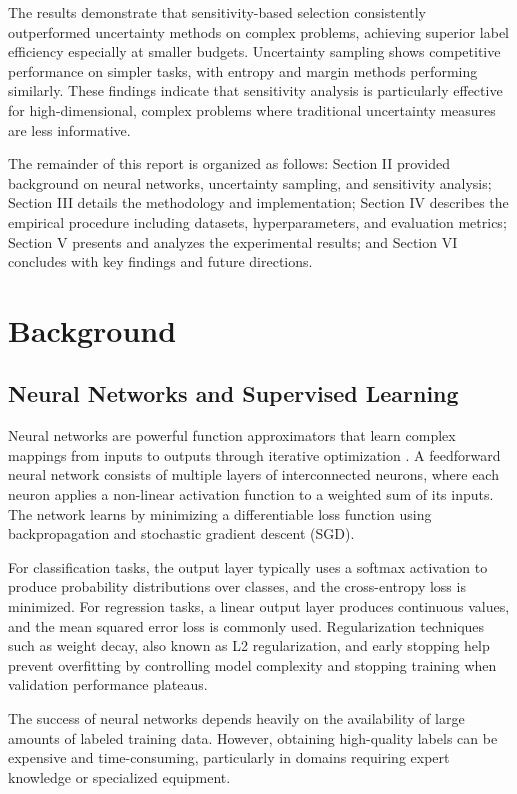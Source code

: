 \documentclass[conference]{IEEEtran}
\begin{document}
The results demonstrate that sensitivity-based selection consistently outperformed uncertainty methods on complex problems, achieving superior label efficiency especially at smaller budgets. Uncertainty sampling shows competitive performance on simpler tasks, with entropy and margin methods performing similarly. These findings indicate that sensitivity analysis is particularly effective for high-dimensional, complex problems where traditional uncertainty measures are less informative.

The remainder of this report is organized as follows: Section II provided background on neural networks, uncertainty sampling, and sensitivity analysis; Section III details the methodology and implementation; Section IV describes the empirical procedure including datasets, hyperparameters, and evaluation metrics; Section V presents and analyzes the experimental results; and Section VI concludes with key findings and future directions.

\section{Background}

\subsection{Neural Networks and Supervised Learning}

Neural networks are powerful function approximators that learn complex mappings from inputs to outputs through iterative optimization \cite{gal2017deep}. A feedforward neural network consists of multiple layers of interconnected neurons, where each neuron applies a non-linear activation function to a weighted sum of its inputs. The network learns by minimizing a differentiable loss function using backpropagation and stochastic gradient descent (SGD).

For classification tasks, the output layer typically uses a softmax activation to produce probability distributions over classes, and the cross-entropy loss is minimized. For regression tasks, a linear output layer produces continuous values, and the mean squared error loss is commonly used. Regularization techniques such as weight decay, also known as L2 regularization, and early stopping help prevent overfitting by controlling model complexity and stopping training when validation performance plateaus.

The success of neural networks depends heavily on the availability of large amounts of labeled training data. However, obtaining high-quality labels can be expensive and time-consuming, particularly in domains requiring expert knowledge or specialized equipment.
\end{document}
